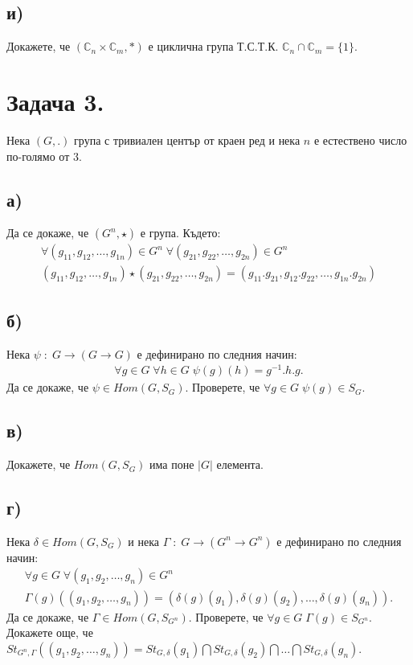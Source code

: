 \documentclass[a4paper, 12pt, oneside]{article}
\begin{document}
\subsection*{и)}
Докажете, че \((\mathbb{C}_n \times \mathbb{C}_m, *)\) е циклична група Т.С.Т.К. \(\mathbb{C}_n \cap \mathbb{C}_m = \{1\}\).
\section*{Задача 3.}
Нека \((G, .)\) група с тривиален център от краен ред и нека \(n\) е естествено число по-голямо от \(3\).
\subsection*{а)}
Да се докаже, че \((G^n, \star)\) е група. Където:
\begin{align*}
    \forall (g_{11}, g_{12}, \dots, g_{1n}) \in G^n \; \forall (g_{21}, g_{22}, \dots, g_{2n}) \in G^n \\
    (g_{11}, g_{12}, \dots, g_{1n}) \star (g_{21}, g_{22}, \dots, g_{2n}) = (g_{11}.g_{21}, g_{12}.g_{22}, \dots, g_{1n}.g_{2n})
\end{align*}
\subsection*{б)}
Нека \(\psi \; : \; G \to (G \to G)\) е дефинирано по следния начин:
\begin{align*}
    \forall g \in G \; \forall h \in G \; \psi(g)(h) = g^{-1}.h.g.
\end{align*}
Да се докаже, че \(\psi \in Hom(G, S_G)\).
Проверете, че \(\forall g \in G \; \psi(g) \in S_G\).
\subsection*{в)}
Докажете, че \(Hom(G, S_G)\) има поне \(|G|\) елемента.
\subsection*{г)}
Нека \(\delta \in Hom(G, S_G)\) и нека \(\Gamma \; : \; G \to (G^n \to G^n)\) е дефинирано по следния начин:
\begin{align*}
    \forall  g \in G \; \forall (g_{1}, g_{2}, \dots, g_{n}) \in G^n \\
    \Gamma(g)((g_{1}, g_{2}, \dots, g_{n})) = (\delta(g)(g_{1}), \delta(g)(g_{2}), \dots, \delta(g)(g_{n})).
\end{align*}
Да се докаже, че \(\Gamma \in Hom(G, S_{G^n})\).
Проверете, че \(\forall g \in G \; \Gamma(g) \in S_{G^n}\). \\
Докажете още, че \(St_{G^n,\Gamma}((g_1, g_2, \dots, g_n)) = St_{G, \delta}(g_1) \bigcap St_{G, \delta}(g_2) \bigcap \dots \bigcap St_{G, \delta}(g_n)\).
\end{document}
